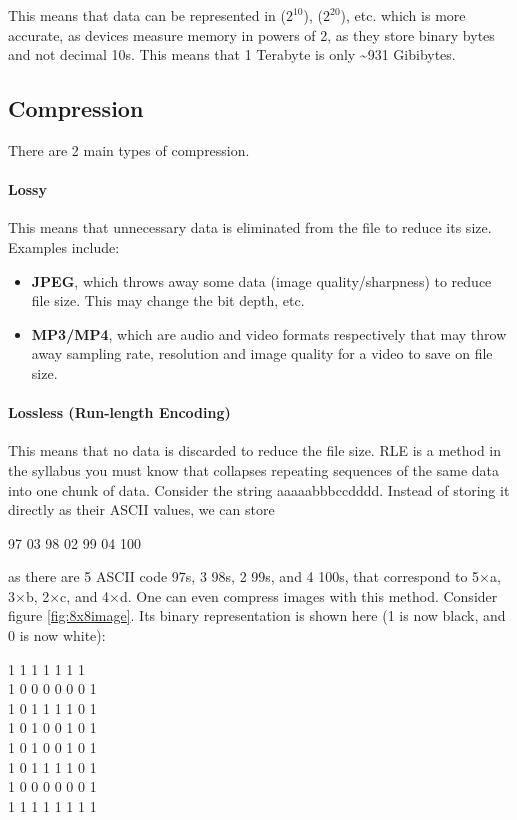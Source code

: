 \documentclass[../main.tex]{subfiles}
\begin{document}
This means that data can be represented in ($2^{10}$), ($2^{20}$), etc. which is more accurate, as devices measure memory in powers of 2, as they store binary bytes and not decimal 10s. This means that 1 Terabyte is only \textasciitilde931 Gibibytes.

\subsection{Compression}

There are 2 main types of compression.

\paragraph{Lossy}

This means that unnecessary data is eliminated from the file to reduce its size. Examples include:

\begin{itemize}
    \item \textbf{JPEG}, which throws away some data (image quality/sharpness) to reduce file size. This may change the bit depth, etc.
    \item \textbf{MP3/MP4}, which are audio and video formats respectively that may throw away sampling rate, resolution and image quality for a video to save on file size. 
\end{itemize}

\paragraph{Lossless (Run-length Encoding)}

This means that no data is discarded to reduce the file size. RLE is a method in the syllabus you must know that collapses repeating sequences of the same data into one chunk of data. Consider the string {\mono aaaaabbbccdddd}. Instead of storing it directly as their ASCII values, we can store

{\centering{} 97 03 98 02 99 04 100
\medskip}

as there are 5 ASCII code 97s, 3 98s, 2 99s, and 4 100s, that correspond to 5×a, 3×b, 2×c, and 4×d. One can even compress images with this method. Consider figure \ref{fig:8x8image}. Its binary representation is shown here (1 is now black, and 0 is now white):

{ 1 1 1 1 1 1 1\\
    1 0 0 0 0 0 0 1\\
    1 0 1 1 1 1 0 1\\
    1 0 1 0 0 1 0 1\\
    1 0 1 0 0 1 0 1\\
    1 0 1 1 1 1 0 1\\
    1 0 0 0 0 0 0 1\\
    1 1 1 1 1 1 1 1\\
\medskip}
\end{document}
